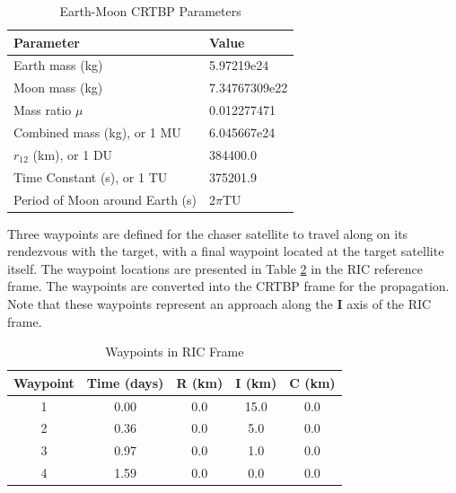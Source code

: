 \documentclass[a4paper]{article}
\begin{document}
\begin{table}[h] 
	\begin{center}
		\begin{tabular}{l l}
			\toprule
			Parameter   & Value \\
			\midrule
			Earth mass (kg) & 5.97219e24 \\
			Moon mass (kg) & 7.34767309e22 \\
			Mass ratio \(\mu\)      & 0.012277471 \\
			Combined mass (kg), or 1 MU & 6.045667e24 \\
			\(r_{12}\) (km), or 1 DU & 384400.0 \\
			Time Constant (s), or 1 TU & 375201.9 \\
			Period of Moon around Earth (s) & 2\(\pi\)TU \\
			\bottomrule
		\end{tabular}
		\caption{Earth-Moon CRTBP Parameters}
		\label{tab:Environment_1}
	\end{center}
\end{table}

Three waypoints are defined for the chaser satellite to travel along on its rendezvous with the target, with a final waypoint located at the target satellite itself.  The waypoint locations are presented in Table \ref{tab:Waypoints_1} in the RIC reference frame.  The waypoints are converted into the CRTBP frame for the propagation.  Note that these waypoints represent an approach along the \(\mathbf{I}\) axis of the RIC frame. 

\begin{table}[h] 
	\begin{center}
		\begin{tabular}{ccccc}
			\toprule
			Waypoint   & Time (days) & R (km) & I (km) & C (km) \\
			\midrule
			1 & 0.00 & 0.0 & 15.0 & 0.0 \\
			2 & 0.36 & 0.0 & 5.0 & 0.0 \\
			3 & 0.97 & 0.0 & 1.0 & 0.0 \\
			4 & 1.59 & 0.0 & 0.0 & 0.0 \\
			\bottomrule
		\end{tabular}
		\caption{Waypoints in RIC Frame}
		\label{tab:Waypoints_1}
	\end{center}
\end{table} 
\end{document}
